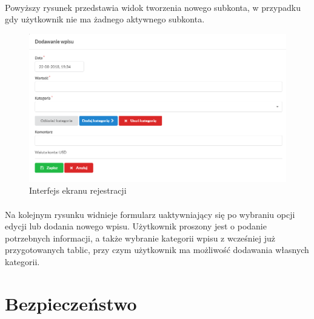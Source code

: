 \documentclass{article}
\begin{document}
\paragraph*{} Powyższy rysunek przedstawia widok tworzenia nowego subkonta, w przypadku gdy użytkownik nie ma żadnego aktywnego subkonta.
\begin{figure}[H]
	\hspace*{-2cm}
	\includegraphics[scale=0.6]{assets/dod.png}
	\caption[]{Interfejs ekranu rejestracji}
	\label{fig:edycja}
\end{figure}
\paragraph*{} Na kolejnym rysunku widnieje formularz uaktywniający się po wybraniu opcji edycji lub dodania nowego wpisu. Użytkownik proszony jest o podanie potrzebnych informacji, a także wybranie kategorii wpisu z wcześniej już przygotowanych tablic, przy czym użytkownik ma możliwość dodawania własnych kategorii.
\section{Bezpieczeństwo}
\end{document}
